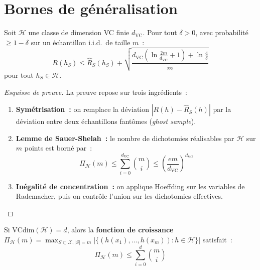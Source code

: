\section{Bornes de g\'en\'eralisation}
\label{sec:generalization-bounds}

\begin{theoreme}
\label{thm:vc-bound}
Soit $\mathcal{H}$ une classe de dimension VC finie $d_{\text{VC}}$.
Pour tout $\delta > 0$, avec probabilit\'e $\geq 1 - \delta$ sur un
\'echantillon i.i.d.\ de taille $m$~:
\begin{equation}
  R(h_S) \leq \hat{R}_S(h_S) +
  \sqrt{\frac{d_{\text{VC}}\left(\ln\frac{2m}{d_{\text{VC}}} + 1\right)
  + \ln\frac{4}{\delta}}{m}}
  \label{eq:vc-bound}
\end{equation}
pour tout $h_S \in \mathcal{H}$.
\end{theoreme}

\begin{proof}[Esquisse de preuve]
La preuve repose sur trois ingr\'edients~:
\begin{enumerate}
  \item \textbf{Sym\'etrisation~:} on remplace la d\'eviation
    $|R(h) - \hat{R}_S(h)|$ par la d\'eviation entre deux \'echantillons
    fantômes (\emph{ghost sample}).
  \item \textbf{Lemme de Sauer-Shelah~:} le nombre de dichotomies
    r\'ealisables par $\mathcal{H}$ sur $m$ points est born\'e par~:
    \begin{equation}
      \Pi_{\mathcal{H}}(m) \leq \sum_{i=0}^{d_{\text{VC}}} \binom{m}{i}
      \leq \left(\frac{em}{d_{\text{VC}}}\right)^{d_{\text{VC}}}
    \end{equation}
  \item \textbf{In\'egalit\'e de concentration~:} on applique Hoeffding sur
    les variables de Rademacher, puis on contr\^ole l'union sur les
    dichotomies effectives.
\end{enumerate}
\end{proof}

\begin{lemme}
\label{lem:sauer}
Si $\text{VCdim}(\mathcal{H}) = d$, alors la \textbf{fonction de croissance}
$\Pi_{\mathcal{H}}(m) = \max_{S \subset \mathcal{X}, |S|=m}
|\{(h(x_1), \ldots, h(x_m)) : h \in \mathcal{H}\}|$ satisfait~:
\begin{equation}
  \Pi_{\mathcal{H}}(m) \leq \sum_{i=0}^{d} \binom{m}{i}
\end{equation}
\end{lemme}

